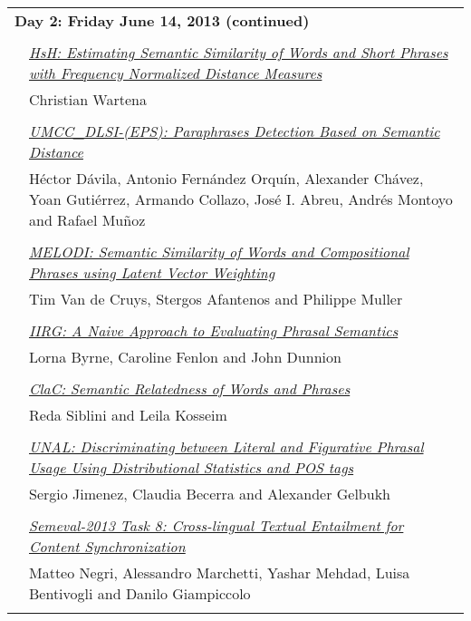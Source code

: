 \begin{tabular}{p{20mm}p{138mm}}
\\
\multicolumn{2}{l}{\bf Day 2: Friday June 14, 2013 (continued)} \\\\


& \hyperlink{page.48}{\em HsH: Estimating Semantic Similarity of Words and Short Phrases with Frequency Normalized Distance Measures}\\
         & Christian Wartena \\
\\

 & \hyperlink{page.93}{\em UMCC\_DLSI-(EPS): Paraphrases Detection Based on Semantic Distance}\\
         & H\'{e}ctor D\'{a}vila, Antonio Fern\'{a}ndez Orqu\'{i}n, Alexander Ch\'{a}vez, Yoan Guti\'{e}rrez, Armando Collazo, Jos\'{e} I. Abreu, Andr\'{e}s Montoyo and Rafael Mu\~{n}oz \\
\\

 & \hyperlink{page.98}{\em MELODI: Semantic Similarity of Words and Compositional Phrases using Latent Vector Weighting}\\
         & Tim Van de Cruys, Stergos Afantenos and Philippe Muller \\
\\

 & \hyperlink{page.103}{\em IIRG: A Naive Approach to Evaluating Phrasal Semantics}\\
         & Lorna Byrne, Caroline Fenlon and John Dunnion \\
\\

 & \hyperlink{page.108}{\em ClaC: Semantic Relatedness of Words and Phrases}\\
         & Reda Siblini and Leila Kosseim \\
\\

 & \hyperlink{page.114}{\em UNAL: Discriminating between Literal and Figurative Phrasal Usage Using Distributional Statistics and POS tags}\\
         & Sergio Jimenez, Claudia Becerra and Alexander Gelbukh \\
\\

& \hyperlink{page.25}{\em Semeval-2013 Task 8: Cross-lingual Textual Entailment for Content Synchronization}\\
         & Matteo Negri, Alessandro Marchetti, Yashar Mehdad, Luisa Bentivogli and Danilo Giampiccolo \\
\\


\end{tabular}
